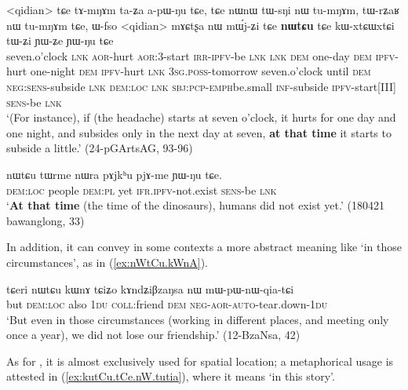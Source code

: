 \begin{exe}
\ex \label{ex:nWtCu.temporal}
\gll <qidian> tɕe tɤ-mŋɤm ta-ʑa a-pɯ-ŋu tɕe, tɕe nɯnɯ tɯ-sŋi nɯ tu-mŋɤm, tɯ-rʑaʁ nɯ tu-mŋɤm tɕe, ɯ-fso <qidian> mɤɕtʂa nɯ mɯ́j-ʑi tɕe \textbf{nɯtɕu} tɕe kɯ-xtɕɯ\redp{}xtɕi tɯ-ʑi ɲɯ-ʑe ɲɯ-ŋu tɕe \\
seven.o'clock \textsc{lnk} \textsc{aor}-hurt \textsc{aor}:3\flobv{}-start \textsc{irr}-\textsc{ipfv}-be \textsc{lnk} \textsc{lnk} \textsc{dem} one-day \textsc{dem} \textsc{ipfv}-hurt  one-night \textsc{dem} \textsc{ipfv}-hurt  \textsc{lnk}  \textsc{3sg}.\textsc{poss}-tomorrow seven.o'clock until \textsc{dem} \textsc{neg}:\textsc{sens}-subside \textsc{lnk} \textsc{dem}:\textsc{loc} \textsc{lnk} \textsc{sbj}:\textsc{pcp}-\textsc{emph}\redp{}be.small \textsc{inf}-subside \textsc{ipfv}-start[III] \textsc{sens}-be \textsc{lnk} \\
\glt `(For instance), if (the headache) starts at seven o'clock, it hurts for one day and one night, and subsides only in the next day at seven, \textbf{at that time} it starts to subside a little.' (24-pGArtsAG, 93-96)
\end{exe}

\begin{exe}
\ex \label{ex:nWtCu.temporal2}
\gll  nɯtɕu tɯrme nɯra pɤjkʰu pjɤ-me ɲɯ-ŋu tɕe. \\
\textsc{dem}:\textsc{loc} people \textsc{dem}:\textsc{pl} yet \textsc{ifr}.\textsc{ipfv}-not.exist \textsc{sens}-be \textsc{lnk}  \\
\glt `\textbf{At that time} (the time of the dinosaurs), humans did not exist yet.' (180421 bawanglong, 33)
\end{exe}

In addition, it can convey in some contexts a more abstract meaning like `in those circumstances', as in (\ref{ex:nWtCu.kWnA}).

\begin{exe}
\ex \label{ex:nWtCu.kWnA}
\gll tɕeri nɯtɕu kɯnɤ tɕiʑo kɤndʑiβzaŋsa nɯ mɯ-pɯ-nɯ-qia-tɕi \\
but \textsc{dem}:\textsc{loc} also \textsc{1du} \textsc{coll}:friend \textsc{dem} \textsc{neg}-\textsc{aor}-\textsc{auto}-tear.down-\textsc{1du} \\
\glt `But even in those circumstances (working in different places, and meeting only once a year), we did not lose our friendship.' (12-BzaNsa, 42)
\end{exe}

As for , it is almost exclusively used for spatial location; a metaphorical usage is attested in (\ref{ex:kutCu.tCe.nW.tutia}), where it means `in this story'.

